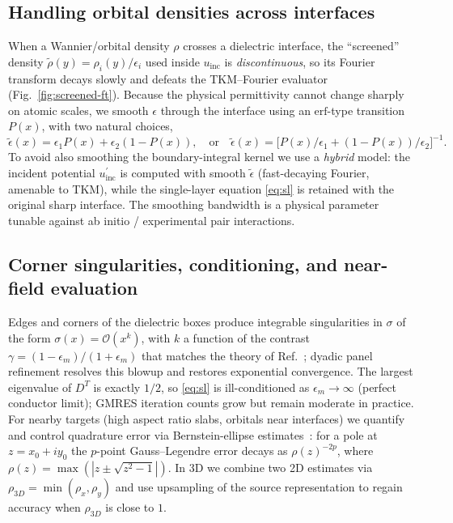 \documentclass[prb,preprintnumbers,amsmath,amssymb, 10pt]{revtex4}
\newcommand{\abs}[1]{\left|#1\right|}
\begin{document}
\subsection{Handling orbital densities across interfaces}

When a Wannier/orbital density $\rho$ crosses a dielectric interface, the
``screened'' density $\tilde\rho(y) = \rho_i(y)/\epsilon_i$ used inside
$u_{\text{inc}}$ is \emph{discontinuous}, so its Fourier transform decays
slowly and defeats the TKM--Fourier evaluator (Fig.~\ref{fig:screened-ft}).
Because the physical permittivity cannot change sharply on atomic scales,
we smooth $\epsilon$ through the interface using an $\text{erf}$-type
transition $P(x)$, with two natural choices,
\begin{equation}
    \tilde\epsilon(x) = \epsilon_1 P(x) + \epsilon_2 (1-P(x)),
    \quad\text{or}\quad
    \tilde\epsilon(x) = \bigl[ P(x)/\epsilon_1 + (1-P(x))/\epsilon_2 \bigr]^{-1}.
\end{equation}
To avoid also smoothing the boundary-integral kernel we use a \emph{hybrid}
model: the incident potential $u_{\text{inc}}^{\prime}$ is computed with
smooth $\tilde\epsilon$ (fast-decaying Fourier, amenable to TKM), while the
single-layer equation \eqref{eq:sl} is retained with the original sharp
interface.  The smoothing bandwidth is a physical parameter tunable against
ab initio / experimental pair interactions.

\subsection{Corner singularities, conditioning, and near-field evaluation}

Edges and corners of the dielectric boxes produce integrable singularities
in $\sigma$ of the form $\sigma(x) = \mathcal{O}(x^k)$, with $k$ a function
of the contrast $\gamma = (1-\epsilon_m)/(1+\epsilon_m)$ that matches the
theory of Ref.~\cite{van2007electromagnetic}; dyadic panel refinement
resolves this blowup and restores exponential convergence.  The largest
eigenvalue of $D^T$ is exactly $1/2$, so \eqref{eq:sl} is ill-conditioned as
$\epsilon_m \to \infty$ (perfect conductor limit); GMRES iteration counts
grow but remain moderate in practice.  For nearby targets (high aspect
ratio slabs, orbitals near interfaces) we quantify and control quadrature
error via Bernstein-ellipse estimates~\cite{trefethen2019approximation}:
for a pole at $z = x_0 + i y_0$ the $p$-point Gauss--Legendre error decays
as $\rho(z)^{-2p}$, where
$\rho(z) = \max(\abs{z\pm\sqrt{z^2-1}})$.  In 3D we combine two 2D
estimates via $\rho_{3D} = \min(\rho_x,\rho_y)$ and use upsampling of the
source representation to regain accuracy when $\rho_{3D}$ is close to $1$.
\end{document}
